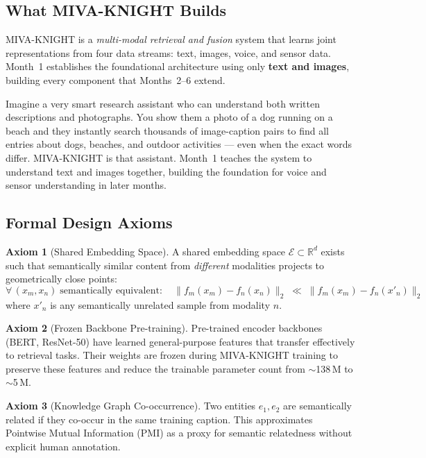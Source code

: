 \documentclass[12pt, a4paper]{article}
\theoremstyle{definition}
\newtheorem{axiom}{Axiom}[section]
\theoremstyle{plain}
\theoremstyle{remark}
\begin{document}
\subsection{What MIVA-KNIGHT Builds}

MIVA-KNIGHT is a \emph{multi-modal retrieval and fusion} system that learns
joint representations from four data streams: text, images, voice, and sensor
data.  Month~1 establishes the foundational architecture using only
\textbf{text and images}, building every component that Months~2--6 extend.

\begin{tcolorbox}[layman]
Imagine a very smart research assistant who can understand both written
descriptions and photographs.  You show them a photo of a dog running on a
beach and they instantly search thousands of image-caption pairs to find all
entries about dogs, beaches, and outdoor activities --- even when the exact
words differ.  MIVA-KNIGHT is that assistant.  Month~1 teaches the system
to understand text and images together, building the foundation for voice
and sensor understanding in later months.
\end{tcolorbox}

\subsection{Formal Design Axioms}

\begin{axiom}[Shared Embedding Space]
A shared embedding space $\mathcal{E} \subset \mathbb{R}^d$ exists such that
semantically similar content from \emph{different} modalities projects to
geometrically close points:
\[
  \forall\,(x_m, x_n)\;\text{semantically equivalent}:\quad
  \|f_m(x_m) - f_n(x_n)\|_2 \;\ll\;
  \|f_m(x_m) - f_n(x'_n)\|_2
\]
where $x'_n$ is any semantically unrelated sample from modality $n$.
\end{axiom}

\begin{axiom}[Frozen Backbone Pre-training]
Pre-trained encoder backbones (BERT, ResNet-50) have learned general-purpose
features that transfer effectively to retrieval tasks.  Their weights are
frozen during MIVA-KNIGHT training to preserve these features and reduce the
trainable parameter count from $\sim$138\,M to $\sim$5\,M.
\end{axiom}

\begin{axiom}[Knowledge Graph Co-occurrence]
Two entities $e_1, e_2$ are semantically related if they co-occur in the
same training caption.  This approximates Pointwise Mutual Information (PMI)
as a proxy for semantic relatedness without explicit human annotation.
\end{axiom}
\end{document}
